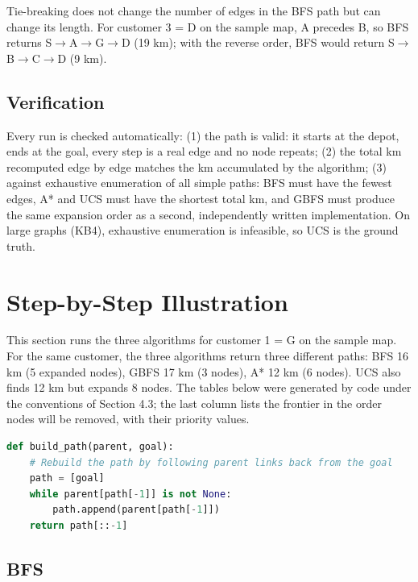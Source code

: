 \documentclass[12pt,a4paper]{article}
\begin{document}
Tie-breaking does not change the number of edges in the BFS
path but can change its length. For customer 3 = D on the
sample map, A precedes B, so BFS returns
S\(\rightarrow\)A\(\rightarrow\)G\(\rightarrow\)D (19 km);
with the reverse order, BFS would return
S\(\rightarrow\)B\(\rightarrow\)C\(\rightarrow\)D (9 km).

\subsection{Verification}

Every run is checked automatically: (1) the path is valid:
it starts at the depot, ends at the goal, every step is a
real edge and no node repeats; (2) the total km recomputed
edge by edge matches the km accumulated by the algorithm;
(3) against exhaustive enumeration of all simple paths: BFS
must have the fewest edges, A* and UCS must have the
shortest total km, and GBFS must produce the same expansion
order as a second, independently written implementation. On
large graphs (KB4), exhaustive enumeration is infeasible, so
UCS is the ground truth.

\section{Step-by-Step Illustration}

This section runs the three algorithms for customer 1 = G on
the sample map. For the same customer, the three algorithms
return three different paths: BFS 16 km (5 expanded nodes),
GBFS 17 km (3 nodes), A* 12 km (6 nodes). UCS also finds 12
km but expands 8 nodes. The tables below were generated by
code under the conventions of Section 4.3; the last column
lists the frontier in the order nodes will be removed, with
their priority values.

\begin{lstlisting}[language=Python, caption={Shared helper.}]
def build_path(parent, goal):
    # Rebuild the path by following parent links back from the goal
    path = [goal]
    while parent[path[-1]] is not None:
        path.append(parent[path[-1]])
    return path[::-1]
\end{lstlisting}

\subsection{BFS}
\end{document}
